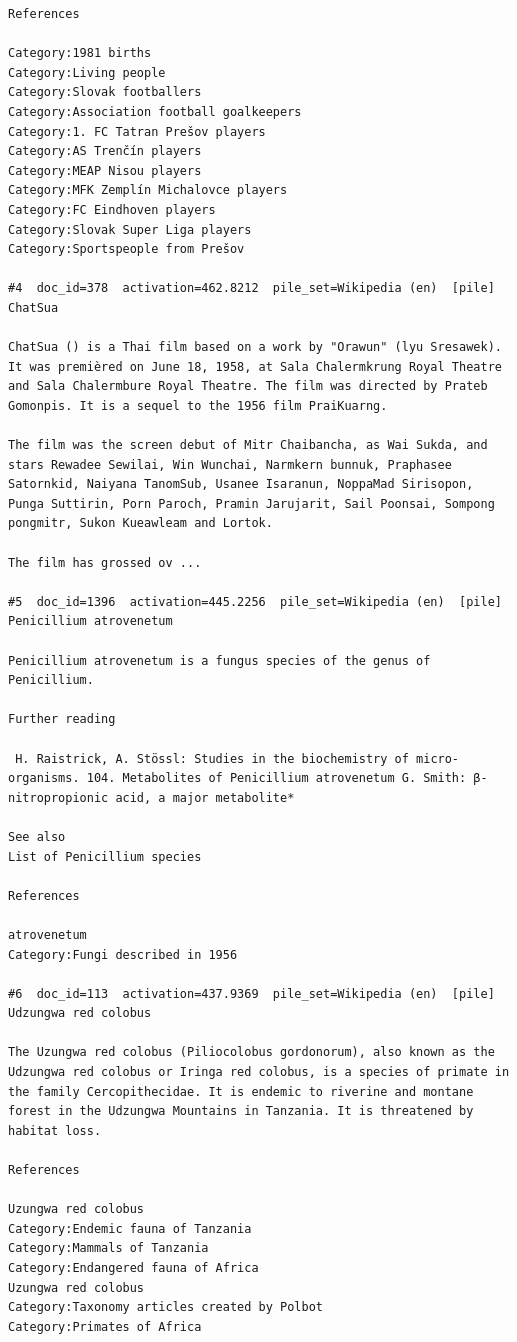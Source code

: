 \begin{verbatim}
References

Category:1981 births
Category:Living people
Category:Slovak footballers
Category:Association football goalkeepers
Category:1. FC Tatran Prešov players
Category:AS Trenčín players
Category:MEAP Nisou players
Category:MFK Zemplín Michalovce players
Category:FC Eindhoven players
Category:Slovak Super Liga players
Category:Sportspeople from Prešov

#4  doc_id=378  activation=462.8212  pile_set=Wikipedia (en)  [pile]
ChatSua

ChatSua () is a Thai film based on a work by "Orawun" (lyu Sresawek). It was premièred on June 18, 1958, at Sala Chalermkrung Royal Theatre and Sala Chalermbure Royal Theatre. The film was directed by Prateb Gomonpis. It is a sequel to the 1956 film PraiKuarng.

The film was the screen debut of Mitr Chaibancha, as Wai Sukda, and stars Rewadee Sewilai, Win Wunchai, Narmkern bunnuk, Praphasee Satornkid, Naiyana TanomSub, Usanee Isaranun, NoppaMad Sirisopon, Punga Suttirin, Porn Paroch, Pramin Jarujarit, Sail Poonsai, Sompong pongmitr, Sukon Kueawleam and Lortok.

The film has grossed ov ...

#5  doc_id=1396  activation=445.2256  pile_set=Wikipedia (en)  [pile]
Penicillium atrovenetum

Penicillium atrovenetum is a fungus species of the genus of Penicillium.

Further reading

 H. Raistrick, A. Stössl: Studies in the biochemistry of micro-organisms. 104. Metabolites of Penicillium atrovenetum G. Smith: β-nitropropionic acid, a major metabolite*

See also
List of Penicillium species

References

atrovenetum
Category:Fungi described in 1956

#6  doc_id=113  activation=437.9369  pile_set=Wikipedia (en)  [pile]
Udzungwa red colobus

The Uzungwa red colobus (Piliocolobus gordonorum), also known as the Udzungwa red colobus or Iringa red colobus, is a species of primate in the family Cercopithecidae. It is endemic to riverine and montane forest in the Udzungwa Mountains in Tanzania. It is threatened by habitat loss.

References

Uzungwa red colobus
Category:Endemic fauna of Tanzania
Category:Mammals of Tanzania
Category:Endangered fauna of Africa
Uzungwa red colobus
Category:Taxonomy articles created by Polbot
Category:Primates of Africa


\end{verbatim}
